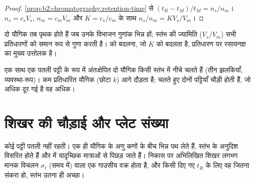 \begin{proof}
\cref{prop:b2:chromatography:retention-time} से $(t_R - t_M)/t_M = n_s/n_m$। $n_s = c_sV_s$,
$n_m = c_mV_m$ और $K = c_s/c_m$ के साथ $n_s/n_m = KV_s/V_m$।
\end{proof}

दो यौगिक तब पृथक होते हैं जब उनके विभाजन गुणांक भिन्न हों; स्तंभ की ज्यामिति ($V_s/V_m$)
सभी प्रतिधारणों को समान रूप से गुणा करती है।  को बदलना, जो $K$ को बदलता है, प्रतिधारण पर रसायनज्ञ का
मुख्य उत्तोलक है।

\begin{omfigure}
\par\vspace{4pt}

{\small एक साथ एक पतली पट्टी के रूप में अंतःक्षेपित दो यौगिक किसी स्तंभ में नीचे चलते हैं (तीन झलकियाँ,
व्यवस्था-रूप)। कम प्रतिधारित यौगिक (छोटा $k$) आगे दौड़ता है; चलते हुए दोनों पट्टियाँ चौड़ी होती हैं, जो
अधिक दूर गई है वह अधिक।}
\end{omfigure}

\section{शिखर की चौड़ाई और प्लेट संख्या}

कोई पट्टी पतली नहीं रहती। एक ही यौगिक के अणु कणों के बीच भिन्न पथ लेते हैं,
स्तंभ के अनुदिश विसरित होते हैं और  में यादृच्छिक मात्राओं से पिछड़ जाते हैं। निकास पर
अभिलिखित शिखर लगभग मानक विचलन $\sigma_t$ (समय में) वाला एक गाउसीय वक्र होता है, और किसी दिए गए $t_R$ के लिए वह जितना
संकरा हो, स्तंभ उतना ही अच्छा।

